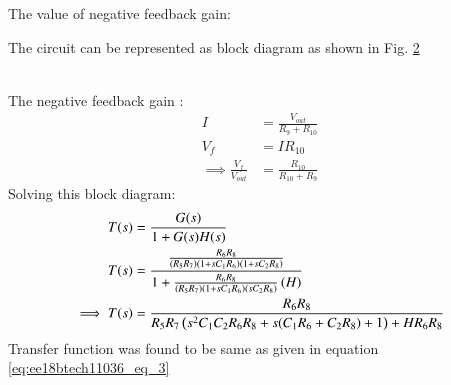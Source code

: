 \begin{enumerate}[label=\arabic*.,ref=\theenumi]
\begin{table}[!ht]
\centering

\caption{}
\label{table:ee18btech11036_ Output_Table}
\end{table}
The value of negative feedback gain:
\begin{figure}[!hbt]
	\begin{center}
			\resizebox{\columnwidth}{!}{}
	\end{center}
\caption{}
\label{fig:ee18btech11036_neg_gain}
\end{figure}




 The circuit can be represented as block diagram as shown in Fig. \ref{fig:ee18btech11036_block_diag}
\begin{figure}[!hbt]
	\begin{center}
			\resizebox{\columnwidth}{!}{}
	\end{center}
\caption{}
\label{fig:ee18btech11036_block_diag}
\end{figure}
\renewcommand{\thefigure}{\theenumi}
\\
The negative feedback gain :
\begin{align}
    I &= \frac{V_{out}}{R_9+R_{10}}
    \label{eq:ee18btech11036_eq_gain1}
    \\
    V_f &= IR_{10}
    \\
    \implies \frac{V_f}{V_{out}} &= \frac{R_{10}}{R_{10}+R_9}
    \label{eq:ee18btech11036_eq_gain2}
\end{align}
Solving this block diagram:
\small
\begin{align}
    T(s) &= \frac{G(s)}{1+G(s)H(s)}
    \label{eq:ee18btech11036_eq_5}
    \\
    T(s) &= \frac{\frac{R_6R_8}{\left(R_5R_7\right)\left(1+sC_1R_6\right)\left(1+sC_2R_8\right)}}{1+\frac{R_6R_8}{\left(R_5R_7\right)\left(1+sC_1R_6\right)\left(sC_2R_8\right)}\left(H\right)}
    \label{eq:ee18btech11036_eq_6}
    \\
    \implies T(s)&=\frac{R_6R_8}{R_5R_7\left(s^2C_1C_2R_6R_8+s(C_1R_6+C_2R_8)+1\right)+HR_6R_8} 
\end{align}
\normalsize
Transfer function was found to be same as given in equation \ref{eq:ee18btech11036_eq_3}


\end{enumerate}
